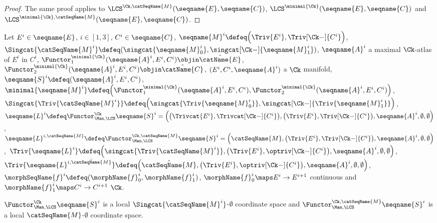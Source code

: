 \documentclass{article}
\begin{document}
\begin{theorem}
\begin{proof}
The same proof applies to $\LCS^{\Ck,\catSeqName{M}}(\seqname{E}, \seqname{C})$,
$\LCS^{\minimal{\Ck}}(\seqname{E}, \seqname{C})$ and
$\LCS^{\minimal{\Ck},\hat{\catSeqName{M}}}(\seqname{E}, \seqname{C})$.
\end{proof}

Let
$E^i \in \seqname{E}$, $i \in [1,3]$, $C^i \in \seqname{C}$,
$\seqname{M}^i \defeq \Bigl ( \Triv{E^i}, \Triv[\Ck-]{C^i} \Bigr )$,
$
  \Singcat{\catSeqName{M}^i} \defeq
  (
    \singcat{\seqname{M}^i_0},
    \singcat[\Ck-]{\seqname{M}^i_1}
  )
$,
$\seqname{A}^i$ a maximal $\Ck$-atlas of $E^i$ in $C^i$,
$
  \Functor^{\minimal{\Ck}}_1 (\seqname{A}^i, E^i, C^i) \objin
  \hat{\catName{E}}
$,
$
  \Functor^{\minimal{\Ck}}_2 (\seqname{A}^i, E^i, C^i) \objin
  \hat{\catName{C}}
$,
$(E^i, C^i, \seqname{A}^i)$ a $\Ck$ manifold,
$\seqname{S}^i \defeq (\seqname{A}^i,E^i, C^i)$,
$
  \minimal{\seqname{M}^i} \defeq
    \Bigl (
      \Functor^{\minimal{\Ck}}_1 (\seqname{A}^i, E^i, C^i),
      \Functor^{\minimal{\Ck}}_2 (\seqname{A}^i, E^i, C^i)
    \Bigr )
$, \\
$
  \Singcat{\Triv{\catSeqName{M}^i}} \defeq
  \Bigl (
    \singcat{\Triv{\seqname{M}^i_0}},
    \singcat[\Ck-]{\Triv{\seqname{M}^i_1}}
  \Bigr )
$,
$
\seqname{L}^i \defeq
\Functor^{\Ck}_{\Man,\LCS} \seqname{S}^i =
\Bigl (
  \bigl (
    \Trivcat{E^i}, \Trivcat[\Ck-]{C^i}
  \bigr ),
  \bigl (
    \Triv{E^i}, \Triv[\Ck-]{C^i}
  \bigr ),
  \seqname{A}^i,
  \emptyset,
  \emptyset
\Bigr )
$,
$
\seqname{L}^{i,\catSeqName{M}} \defeq
\Functor^{\Ck,\catSeqName{M}}_{\Man,\LCS} \seqname{S}^i =
\Bigl (
  \catSeqName{M},
  \bigl (
    \Triv{E^i}, \Triv[\Ck-]{C^i}
  \bigr ),
  \seqname{A}^i,
  \emptyset,
  \emptyset
\Bigr )
$,
$
\Triv{\seqname{L}^i} \defeq
\Bigl (
  \singcat{\Triv{\catSeqName{M}^i}},
  \bigl (
    \Triv{E^i}, \optriv[\Ck-]{C^i}
  \bigr ),
  \seqname{A}^i,
  \emptyset,
  \emptyset
\Bigr )
$,
$
\Triv{\seqname{L}^{i,\hat{\catSeqName{M}}}} \defeq
\Bigl (
  \hat{\catSeqName{M}},
  \bigl (
    \Triv{E^i}, \optriv[\Ck-]{C^i}
  \bigr ),
  \seqname{A}^i,
  \emptyset,
  \emptyset
\Bigr )
$,
$\morphSeqName{f}^i \defeq (\morphName{f}^i_0, \morphName{f}^i_1)$,
$\morphName{f}^i_0 \maps E^i \to E^{i+1}$ continuous and
$\morphName{f}^i_1 \maps C^i \to C^{i+1}$ $\Ck$.

$\Functor^\Ck_{\Man,\LCS} \seqname{S}^i$ is a local
$\Singcat{\catSeqName{M}^i}$-$\emptyset$ coordinate space and
$\Functor^{\Ck,\catSeqName{M}}_{\Man,\LCS} \seqname{S}^i$ is a local
$\catSeqName{M}$-$\emptyset$ coordinate space.


\end{theorem}
\end{document}
